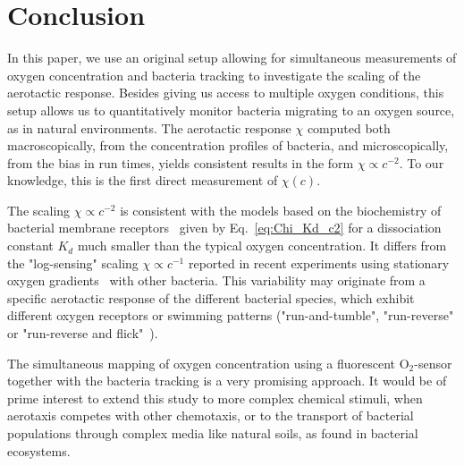 \documentclass[aps,a4paper,twocolumn,10pt,pre,showpacs]{revtex4-2}
\begin{document}
\section{Conclusion}
\label{sec:ccl}

In this paper, we use an original setup allowing for simultaneous measurements of oxygen concentration and bacteria tracking to investigate the scaling of the aerotactic response. Besides giving us access to multiple oxygen conditions, this setup allows us to quantitatively monitor bacteria migrating to an oxygen source, as in natural environments.
The aerotactic response $\chi$ computed both macroscopically, from the concentration profiles of bacteria, and microscopically, from the bias in run times, yields consistent results in the form $\chi \propto c^{-2}$. To our knowledge, this is the first direct measurement of $\chi(c)$.


The scaling $\chi \propto c^{-2}$ is consistent with the models based on the biochemistry of bacterial membrane receptors~\cite{brown1974temporal,lapidus1976model,rivero1989transport} given by Eq.~\eqref{eq:Chi_Kd_c2} for a dissociation constant $K_d$ much smaller than the typical oxygen concentration. It differs from the "log-sensing" scaling $\chi \propto c^{-1}$  reported in recent experiments using stationary oxygen gradients~\cite{kalinin2009,menolascina2017logarithmic} with other bacteria. 
This variability may originate from a specific aerotactic response of the different bacterial species, which exhibit different oxygen receptors or swimming patterns ("run-and-tumble", "run-reverse" or "run-reverse and flick"~\cite{taktikos2013motility, grognot_2021_propellers}).

The simultaneous mapping of oxygen concentration using a fluorescent O$_2$-sensor together with the bacteria tracking is a very promising approach. It would be of prime interest to extend this study to more complex chemical stimuli, when aerotaxis competes with other chemotaxis, or to the transport of bacterial populations through complex media like natural soils, as found in bacterial ecosystems.


\end{document}
